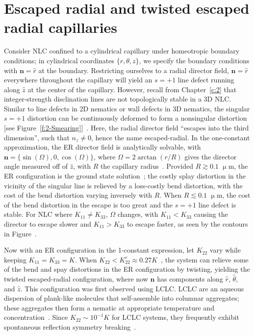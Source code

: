 \section{Escaped radial and twisted escaped radial capillaries}
Consider NLC confined to a cylindrical capillary under homeotropic boundary conditions; in cylindrical coordinates $\{r,\theta,z\}$, we specify the boundary conditions with $\mathbf{n} = \hat{r}$ at the boundary.
Restricting ourselves to a radial director field, $\mathbf{n} = \hat{r}$ everywhere throughout the capillary will yield an $s = +1$ line defect running along $\hat{z}$ at the center of the capillary.
However, recall from Chapter~\ref{c:2} that integer-strength disclination lines are not topologically stable in a 3D NLC.
Similar to line defects in 2D nematics or wall defects in 3D nematics, the singular $s = +1$ distortion can be continuously deformed to form a nonsingular distortion [see Figure~\ref{f:2-Smearing}]~\cite{RN179,RN290,RN289}.
Here, the radial director field ``escapes into the third dimension'', such that  $n_{z} \neq 0$, hence the name escaped-radial.
In the one-constant approximation, the ER director field is analytically solvable, with $\mathbf{n} = \{\sin(\Omega),0,\cos(\Omega)\}$, where $\Omega = 2 \arctan(r/R)$ gives the director angle measured off of $\hat{z}$, with $R$ the capillary radius~\cite{RN179,RN290}.
Provided $R \gtrsim 0.1$ $\upmu$m, the ER configuration is the ground state solution~\cite{RN194}; the costly splay distortion in the vicinity of the singular line is relieved by a loss-costly bend distortion, with the cost of the bend distortion varying inversely with $R$.
When $R \lesssim 0.1$ $\upmu$m, the cost of the bend distortion in the escape is too great and the $s = +1$ line defect is stable.
For NLC where $K_{11} \neq K_{33}$, $\Omega$ changes, with $K_{11} < K_{33}$ causing the director to escape slower and  $K_{11} > K_{33}$ to escape faster, as seen by the contours in Figure~.

Now with an ER configuration in the 1-constant expression, let $K_{22}$ vary while keeping $K_{11} = K_{33} = K$.
When $K_{22} < K^c_{22} \approx 0.27K$~\cite{RN192}, the system can relieve some of the bend and spay distortions in the ER configuration by twisting, yielding the twisted escaped-radial configuration, where now $\mathbf{n}$ has components along $\hat{r}$, $\hat{\theta}$, and $\hat{z}$.
This configuration was first observed using LCLC. LCLC are an aqueous dispersion of plank-like molecules that self-assemble into columnar aggregates; these aggregates then form a nematic at appropriate temperature and concentration~\cite{RN303}.
Since $K_{22} \sim 10^{-1}K$ for LCLC systems, they frequently exhibit spontaneous reflection symmetry breaking~\cite{RN192,RN191,RN293,RN193,RN302}.

